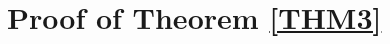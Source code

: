 \documentclass[11pt]{article}
\newcommand{\1}{\mathbbm{1}}
\begin{document}

\section{Proof of Theorem  \ref{THM3}} \label{sec:THM-lowerB}



\end{document}
